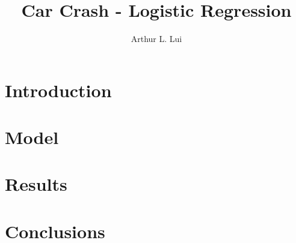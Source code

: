 \documentclass{beamer}
\title{Car Crash - Logistic Regression}
\author[Arthur Lui]{Arthur L. Lui}
\institute[Brigham Young University]{
  Department of Statistics\\
  Brigham Young University
}
\begin{document}
  \frame{\titlepage}

  \section{Introduction}

  \section{Model}

  \section{Results}
  \frame{}

  \section{Conclusions}
  \frame{}

 
\end{document}
